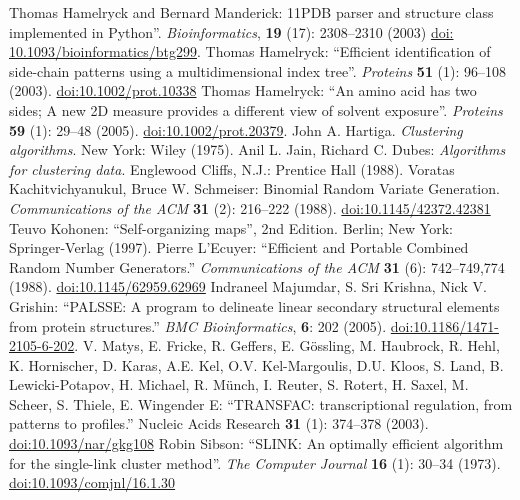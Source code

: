 \documentclass{report}
\begin{document}
\begin{thebibliography}{99}
Thomas Hamelryck and  Bernard Manderick: 11PDB parser and structure class
implemented in Python''. \textit{Bioinformatics}, \textbf{19} (17): 2308--2310 (2003) \href{http://dx.doi.org/10.1093/bioinformatics/btg299}{doi: 10.1093/bioinformatics/btg299}. 
Thomas Hamelryck: ``Efficient identification of side-chain patterns using a multidimensional index tree''. \textit{Proteins} {\bf 51} (1): 96--108 (2003). \href{http://dx.doi.org/10.1002/prot.10338}{doi:10.1002/prot.10338}
Thomas Hamelryck: ``An amino acid has two sides; A new 2D measure provides a different view of solvent exposure''. \textit{Proteins} {\bf 59} (1): 29--48 (2005). \href{http://dx.doi.org/10.1002/prot.20379}{doi:10.1002/prot.20379}.
John A. Hartiga. \textit{Clustering algorithms}. New York: Wiley (1975).
Anil L. Jain, Richard C. Dubes: \textit{Algorithms for clustering data}. Englewood Cliffs, N.J.: Prentice Hall (1988).
Voratas Kachitvichyanukul, Bruce W. Schmeiser: Binomial Random Variate Generation. \textit{Communications of the ACM} {\bf 31} (2): 216--222 (1988). \href{http://dx.doi.org/10.1145/42372.42381}{doi:10.1145/42372.42381}
Teuvo Kohonen: ``Self-organizing maps'', 2nd Edition. Berlin; New York: Springer-Verlag (1997).
Pierre L'Ecuyer: ``Efficient and Portable Combined Random Number Generators.''
\textit{Communications of the ACM} {\bf 31} (6): 742--749,774 (1988). \href{http://dx.doi.org/10.1145/62959.62969}{doi:10.1145/62959.62969}
Indraneel Majumdar, S. Sri Krishna, Nick V. Grishin: ``PALSSE: A program to delineate linear secondary structural elements from protein structures.'' \textit{BMC Bioinformatics}, {\bf 6}: 202 (2005). \href{http://dx.doi.org/10.1186/1471-2105-6-202}{doi:10.1186/1471-2105-6-202}.
V. Matys, E. Fricke, R. Geffers, E. G\"ossling, M. Haubrock, R. Hehl, K. Hornischer, D. Karas, A.E. Kel, O.V. Kel-Margoulis, D.U. Kloos, S. Land, B. Lewicki-Potapov, H. Michael, R. M\"unch, I. Reuter, S. Rotert, H. Saxel, M. Scheer, S. Thiele, E. Wingender E: ``TRANSFAC: transcriptional regulation, from patterns to profiles.'' Nucleic Acids Research {\bf 31} (1): 374--378 (2003). \href{http://dx.doi.org/10.1093/nar/gkg108}{doi:10.1093/nar/gkg108}
Robin Sibson: ``SLINK: An optimally efficient algorithm for the single-link cluster method''. \textit{The Computer Journal} {\bf 16} (1): 30--34 (1973). \href{http://dx.doi.org/10.1093/comjnl/16.1.30}{doi:10.1093/comjnl/16.1.30}

\end{thebibliography}
\end{document}
